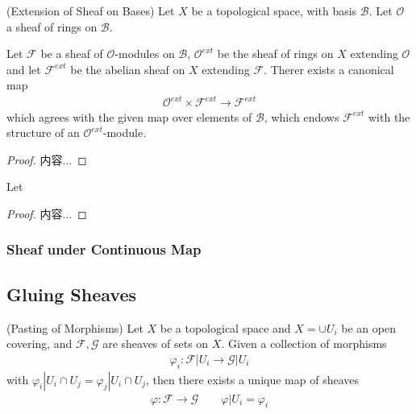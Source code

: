 \documentclass[Total.tex]{subfiles}
\begin{document}
					\begin{lemma}
						(Extension of Sheaf on Bases) Let $X$ be a topological space, with basis $\mathcal{B}$. Let $\mathcal{O}$ a sheaf of rings on $\mathcal{B}$.
						
						Let $\mathcal{F}$ be a sheaf of $\mathcal{O}$-modules on $\mathcal{B}$, $\mathcal{O}^{ext}$ be the sheaf of rings on $X$ extending $\mathcal{O}$ and let $\mathcal{F}^{ext}$ be the abelian sheaf on $X$ extending $\mathcal{F}$. Therer exists a canonical map
						\begin{gather*}
							\mathcal{O}^{ext}\times \mathcal{F}^{ext}\rightarrow \mathcal{F}^{ext}
						\end{gather*}
						which agrees with the given map over elements of $\mathcal{B}$, which endows $\mathcal{F}^{ext}$ with the structure of an $\mathcal{O}^{ext}$-module. 
					\end{lemma}
					\begin{proof}
						内容...
					\end{proof}
					
					\begin{corollary}
						Let 
					\end{corollary}
					\begin{proof}
						内容...
					\end{proof}
				\subsubsection{Sheaf under Continuous Map}
			\subsection{Gluing Sheaves}
			
				\begin{lemma}
					(Pasting of Morphisms) \label{Sheaves-Pasting-of-Morphisms-between-Sheaves} Let $X$ be a topological space and $X=\cup U_i$ be an open covering, and $\mathcal{F},\mathcal{G}$ are sheaves of sets on $X$. Given a collection of morphisms
					\begin{gather*}
						\varphi_i:\mathcal{F}|U_i\rightarrow \mathcal{G}|U_i
					\end{gather*}
					with $\varphi_i|U_i\cap U_j=\varphi_j|U_i\cap U_j$, then there exists a unique map of sheaves
					\begin{gather*}
						\varphi:\mathcal{F}\rightarrow \mathcal{G}\qquad \varphi|U_i=\varphi_i
					\end{gather*}
				\end{lemma}
				
\end{document}
